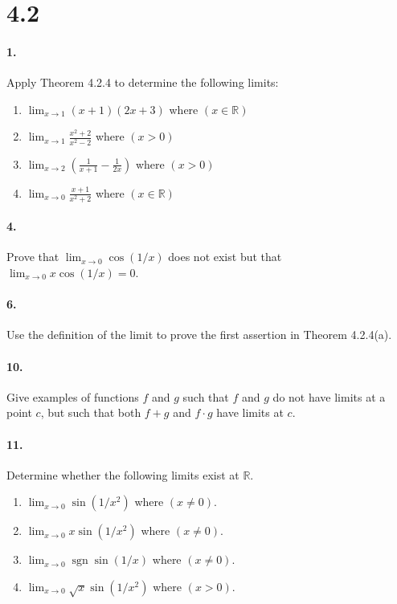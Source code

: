 \documentclass[12pt]{article}
\newcommand\R{\mathbb{R}}
\newcommand{\sgn}{\operatorname{sgn}}
\theoremstyle{remark}
\begin{document}
\section*{4.2}
\paragraph{1.} Apply Theorem 4.2.4 to determine the following limits:
\begin{enumerate}[label=(\alph*)]
    \item $\lim_{x \to 1} (x + 1)(2x + 3)$ where $(x \in \R)$
    \item $\lim_{x \to 1} \frac{x^2 + 2}{x^2 - 2}$ where $(x > 0)$
    \item $\lim_{x \to 2} (\frac{1}{x + 1} - \frac{1}{2x})$ where $(x > 0)$
    \item $\lim_{x \to 0} \frac{x + 1}{x^2 + 2}$ where $(x \in \R)$
\end{enumerate}

\paragraph{4.} Prove that $\lim_{x \to 0} \cos(1/x)$ does not exist but that $\lim_{x \to 0} x \cos(1/x) = 0$.

\paragraph{6.} Use the definition of the limit to prove the first assertion in Theorem 4.2.4(a).

\paragraph{10.} Give examples of functions $f$ and $g$ such that $f$ and $g$ do not have limits at a point $c$, but such that both $f + g$ and $f \cdot g$ have limits at $c$.

\paragraph{11.} Determine whether the following limits exist at $\R$.
\begin{enumerate}[label=(\alph*)]
    \item $\lim_{x \to 0} \sin(1/x^2)$ where $(x \neq 0)$.
    \item $\lim_{x \to 0} x \sin(1/x^2)$ where $(x \neq 0)$.
    \item $\lim_{x \to 0} \sgn \sin(1/x)$ where $(x \neq 0)$.
    \item $\lim_{x \to 0} \sqrt{x} \sin(1/x^2)$ where $(x > 0)$.
\end{enumerate}
\end{document}
